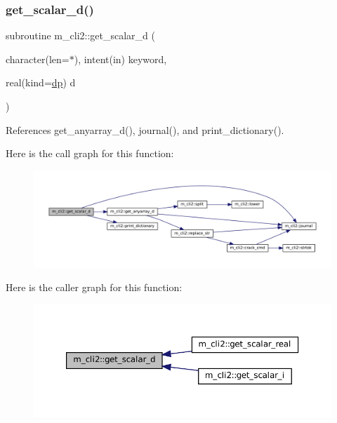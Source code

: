 \subsubsection{\texorpdfstring{get\+\_\+scalar\+\_\+d()}{get\_scalar\_d()}}
{\footnotesize\ttfamily subroutine m\+\_\+cli2\+::get\+\_\+scalar\+\_\+d (\begin{DoxyParamCaption}\item[{character(len=$\ast$), intent(in)}]{keyword,  }\item[{real(kind=\mbox{\hyperlink{namespacem__cli2_acf83f1963cf6a56ad0221cfcf5402440}{dp}})}]{d }\end{DoxyParamCaption})\hspace{0.3cm}{\ttfamily [private]}}



References get\+\_\+anyarray\+\_\+d(), journal(), and print\+\_\+dictionary().

Here is the call graph for this function\+:\nopagebreak
\begin{figure}[H]
\begin{center}
\leavevmode
\includegraphics[width=350pt]{namespacem__cli2_a338757660adde093db76b7d5559a1906_cgraph}
\end{center}
\end{figure}
Here is the caller graph for this function\+:\nopagebreak
\begin{figure}[H]
\begin{center}
\leavevmode
\includegraphics[width=350pt]{namespacem__cli2_a338757660adde093db76b7d5559a1906_icgraph}
\end{center}
\end{figure}
\mbox{\label{namespacem__cli2_a9dcc99d34db1771959a1461274ae073e}} 
